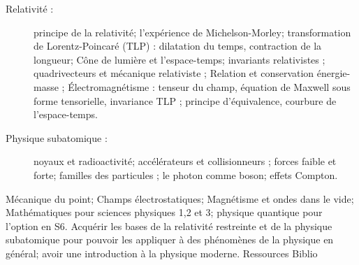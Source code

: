 \documentclass[10pt, a5paper]{report}
\begin{document}
\vfill


{\begin{description}
\item[Relativité :] principe de la relativité; l'expérience de Michelson-Morley; transformation de Lorentz-Poincaré (TLP) : dilatation du temps, contraction de la longueur; Cône de lumière et l'espace-temps; invariants relativistes ; quadrivecteurs et mécanique relativiste ; Relation et conservation énergie-masse ; \'Electromagnétisme : tenseur du champ, équation de Maxwell sous forme tensorielle, invariance TLP ; principe d'équivalence, courbure de l'espace-temps.
\item[Physique subatomique :] noyaux et radioactivité; accélérateurs et collisionneurs ; forces faible et forte; familles des particules ; le photon comme boson; effets Compton.
\end{description}
}
{Mécanique du point; Champs électrostatiques; Magnétisme et ondes dans le vide; Mathématiques pour sciences physiques 1,2 et 3; physique quantique pour l'option en S6.}
{Acquérir les bases de la relativité restreinte et de la physique subatomique pour pouvoir les appliquer à des phénomènes de la physique en général; avoir une introduction à la physique moderne.}
{Ressources} 
{Biblio} 

\vfill

\end{document}
